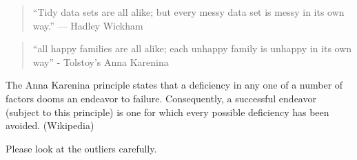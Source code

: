 \documentclass[
]{article}
\begin{document}
\begin{quote}
``Tidy data sets are all alike; but every messy data set is messy in its
own way.'' --- Hadley Wickham
\end{quote}

\begin{quote}
``all happy families are all alike; each unhappy family is unhappy in
its own way'' - Tolstoy's Anna Karenina
\end{quote}

The Anna Karenina principle states that a deficiency in any one of a
number of factors dooms an endeavor to failure. Consequently, a
successful endeavor (subject to this principle) is one for which every
possible deficiency has been avoided. (Wikipedia)

Please look at the outliers carefully.
\end{document}
